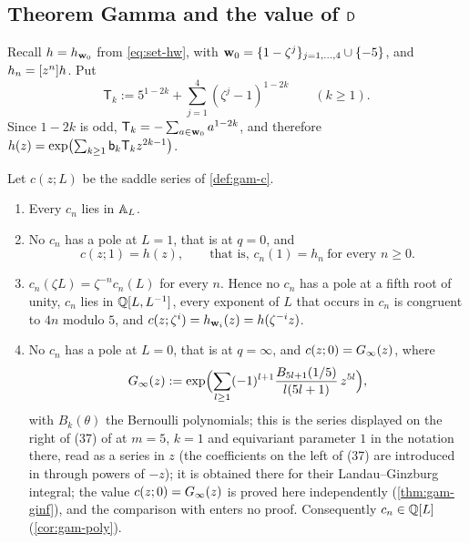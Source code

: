 
\subsection{Theorem Gamma and the value of \texorpdfstring{$\mathsf{D}$}{D}}
\label{sec:gam-thm}

Recall $h=h_{\mathbf{w}_0}$ from \eqref{eq:set-hw}, with $\mathbf{w}_0=\{1-\zeta^j\}_{j=1,\dots,4}\cup\{-5\}$, and $h_n=[z^n]h$. Put
\[
\mathsf T_k:=5^{1-2k}+\sum_{j=1}^4(\zeta^j-1)^{1-2k}\qquad(k\geq 1).
\]
Since $1-2k$ is odd, $\mathsf T_k=-\sum_{a\in\mathbf{w}_0}a^{1-2k}$, and therefore $h(z)=\exp\bigl(\sum_{k\geq 1}\mathsf{b}_k\mathsf T_kz^{2k-1}\bigr)$.

\begin{thm}
\label{thm:gam-main}
Let $c(z;L)$ be the saddle series of \cref{def:gam-c}.
\begin{enumerate}
\item Every $c_n$ lies in $\mathbb{A}_{L}$.
\item No $c_n$ has a pole at $L=1$, that is at $q=0$, and
\begin{equation}
\tag{$\Gamma$}
\label{eq:gam-Gamma}
c(z;1)=h(z),\qquad\text{that is, }c_n(1)=h_n\ \text{for every }n\geq 0.
\end{equation}
\item $c_n(\zeta L)=\zeta^{-n}c_n(L)$ for every $n$. Hence no $c_n$ has a pole at a fifth root of unity, $c_n$ lies in $\mathbb{Q}[L,L^{-1}]$, every exponent of $L$ that occurs in $c_n$ is congruent to $4n$ modulo $5$, and $c(z;\zeta^i)=h_{\mathbf{w}_i}(z)=h(\zeta^{-i}z)$.
\item No $c_n$ has a pole at $L=0$, that is at $q=\infty$, and $c(z;0)=G_{\infty}(z)$, where
\[
G_{\infty}(z):=\exp\Bigl(\sum_{l\geq 1}(-1)^{l+1}\frac{B_{5l+1}(1/5)}{l(5l+1)}\,z^{5l}\Bigr),
\]
with $B_k(\theta)$ the Bernoulli polynomials; this is the series displayed on the right of (37) of \cite[Lemma~7.7]{GJR18} at $m=5$, $k=1$ and equivariant parameter $1$ in the notation there, read as a series in $z$ (the coefficients on the left of (37) are introduced in \cite[Corollary~7.6]{GJR18} through powers of $-z$); it is obtained there for their Landau--Ginzburg integral; the value $c(z;0)=G_{\infty}(z)$ is proved here independently (\cref{thm:gam-ginf}), and the comparison with \cite{GJR18} enters no proof. Consequently $c_n\in\mathbb{Q}[L]$ (\cref{cor:gam-poly}).
\end{enumerate}
\end{thm}

